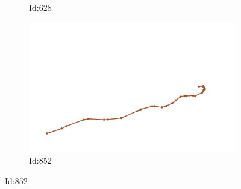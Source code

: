\documentclass[12pt,twoside]{report}
\begin{document}
\begin{figure}
\begin{subfigure}[b]{0.20\textwidth}
\caption{Id:628}
\end{subfigure}
\begin{subfigure}[b]{0.20\textwidth}
\centering
\includegraphics[width=\textwidth]{../../trajectories/852.png}
\caption{Id:852}
\end{subfigure}
\end{figure}
\end{document}

